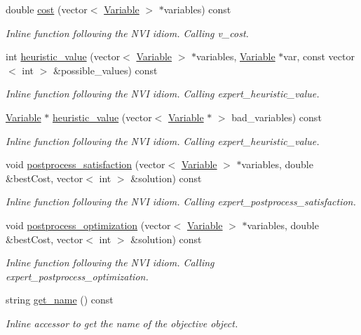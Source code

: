 \begin{DoxyCompactItemize}
double \hyperlink{classghost_1_1Objective_adf174d82bf2a9f9b0ad72f11a279799e}{cost} (vector$<$ \hyperlink{classghost_1_1Variable}{Variable} $>$ $\ast$variables) const 
\begin{DoxyCompactList}\small\item\em Inline function following the N\+VI idiom. Calling v\+\_\+cost. \end{DoxyCompactList}\item 
int \hyperlink{classghost_1_1Objective_a0da0d81b3f4c83cb6f4b2a33e2822d2f}{heuristic\+\_\+value} (vector$<$ \hyperlink{classghost_1_1Variable}{Variable} $>$ $\ast$variables, \hyperlink{classghost_1_1Variable}{Variable} $\ast$var, const vector$<$ int $>$ \&possible\+\_\+values) const 
\begin{DoxyCompactList}\small\item\em Inline function following the N\+VI idiom. Calling expert\+\_\+heuristic\+\_\+value. \end{DoxyCompactList}\item 
\hyperlink{classghost_1_1Variable}{Variable} $\ast$ \hyperlink{classghost_1_1Objective_af21823582664ad75307439adf3cb1f5e}{heuristic\+\_\+value} (vector$<$ \hyperlink{classghost_1_1Variable}{Variable} $\ast$ $>$ bad\+\_\+variables) const 
\begin{DoxyCompactList}\small\item\em Inline function following the N\+VI idiom. Calling expert\+\_\+heuristic\+\_\+value. \end{DoxyCompactList}\item 
void \hyperlink{classghost_1_1Objective_af7ae98042b3ba81a9bd501d542820b66}{postprocess\+\_\+satisfaction} (vector$<$ \hyperlink{classghost_1_1Variable}{Variable} $>$ $\ast$variables, double \&best\+Cost, vector$<$ int $>$ \&solution) const 
\begin{DoxyCompactList}\small\item\em Inline function following the N\+VI idiom. Calling expert\+\_\+postprocess\+\_\+satisfaction. \end{DoxyCompactList}\item 
void \hyperlink{classghost_1_1Objective_a93e4461791d365f18078d3fc7d23a67d}{postprocess\+\_\+optimization} (vector$<$ \hyperlink{classghost_1_1Variable}{Variable} $>$ $\ast$variables, double \&best\+Cost, vector$<$ int $>$ \&solution) const 
\begin{DoxyCompactList}\small\item\em Inline function following the N\+VI idiom. Calling expert\+\_\+postprocess\+\_\+optimization. \end{DoxyCompactList}\item 
string \hyperlink{classghost_1_1Objective_a27e8ef04bf5cfc74d931742a578b282e}{get\+\_\+name} () const 
\begin{DoxyCompactList}\small\item\em Inline accessor to get the name of the objective object. \end{DoxyCompactList}\end{DoxyCompactItemize}
